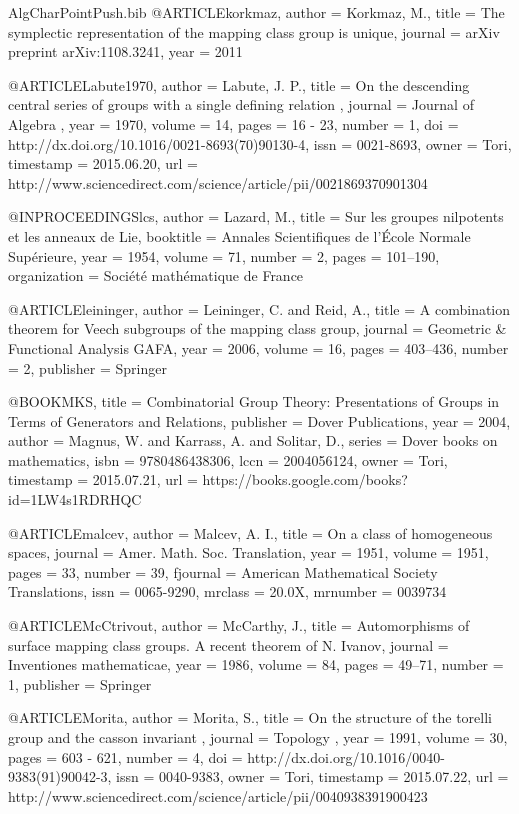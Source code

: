 \documentclass[a4paper]{amsproc}
\theoremstyle{TheoremNum}
\theoremstyle{Theorembold}
\theoremstyle{TheoremboldDef}
\theoremstyle{TheoremboldRem}
\theoremstyle{TheoremboldRem}
\begin{document}
\begin{filecontents}{AlgCharPointPush.bib}
@ARTICLE{korkmaz,
  author = {Korkmaz, M.},
  title = {The symplectic representation of the mapping class group is unique},
  journal = {arXiv preprint arXiv:1108.3241},
  year = {2011}
}

@ARTICLE{Labute1970,
  author = {Labute, J. P.},
  title = {On the descending central series of groups with a single defining
	relation },
  journal = {Journal of Algebra },
  year = {1970},
  volume = {14},
  pages = {16 - 23},
  number = {1},
  doi = {http://dx.doi.org/10.1016/0021-8693(70)90130-4},
  issn = {0021-8693},
  owner = {Tori},
  timestamp = {2015.06.20},
  url = {http://www.sciencedirect.com/science/article/pii/0021869370901304}
}

@INPROCEEDINGS{lcs,
  author = {Lazard, M.},
  title = {Sur les groupes nilpotents et les anneaux de Lie},
  booktitle = {Annales Scientifiques de l'{\'E}cole Normale Sup{\'e}rieure},
  year = {1954},
  volume = {71},
  number = {2},
  pages = {101--190},
  organization = {Soci{\'e}t{\'e} math{\'e}matique de France}
}

@ARTICLE{leininger,
  author = {Leininger, C. and Reid, A.},
  title = {A combination theorem for {V}eech subgroups of the mapping class
	group},
  journal = {Geometric \& Functional Analysis GAFA},
  year = {2006},
  volume = {16},
  pages = {403--436},
  number = {2},
  publisher = {Springer}
}

@BOOK{MKS,
  title = {Combinatorial Group Theory: Presentations of Groups in Terms of Generators
	and Relations},
  publisher = {Dover Publications},
  year = {2004},
  author = {Magnus, W. and Karrass, A. and Solitar, D.},
  series = {Dover books on mathematics},
  isbn = {9780486438306},
  lccn = {2004056124},
  owner = {Tori},
  timestamp = {2015.07.21},
  url = {https://books.google.com/books?id=1LW4s1RDRHQC}
}

@ARTICLE{malcev,
  author = {Malcev, A. I.},
  title = {On a class of homogeneous spaces},
  journal = {Amer. Math. Soc. Translation},
  year = {1951},
  volume = {1951},
  pages = {33},
  number = {39},
  fjournal = {American Mathematical Society Translations},
  issn = {0065-9290},
  mrclass = {20.0X},
  mrnumber = {0039734}
}

@ARTICLE{McCtrivout,
  author = {McCarthy, J.},
  title = {Automorphisms of surface mapping class groups. A recent theorem of
	{N}. Ivanov},
  journal = {Inventiones mathematicae},
  year = {1986},
  volume = {84},
  pages = {49--71},
  number = {1},
  publisher = {Springer}
}

@ARTICLE{Morita,
  author = {Morita, S.},
  title = {On the structure of the torelli group and the casson invariant },
  journal = {Topology },
  year = {1991},
  volume = {30},
  pages = {603 - 621},
  number = {4},
  doi = {http://dx.doi.org/10.1016/0040-9383(91)90042-3},
  issn = {0040-9383},
  owner = {Tori},
  timestamp = {2015.07.22},
  url = {http://www.sciencedirect.com/science/article/pii/0040938391900423}
}


\end{filecontents}
\end{document}
